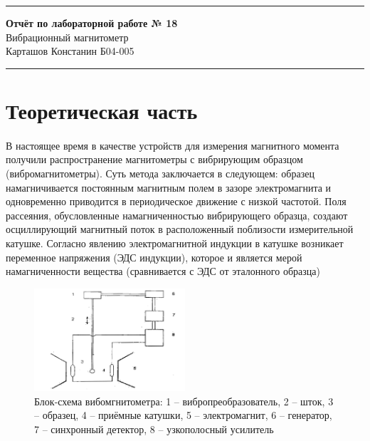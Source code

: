 \documentclass[a4paper,12pt]{article} %
\begin{document}


\hrule 	
\medskip
\begin{raggedright}
{\large \textbf{Отчёт по лабораторной работе № 18}}
\\
\medskip
{\Large Вибрационный магнитометр} 
\\
\medskip
{\large Карташов Констанин Б04-005}
\medskip
\hrule
\medskip
\end{raggedright}


\section{Теоретическая часть}

\paragraph{}
	В настоящее время в качестве устройств для измерения магнитного момента получили распространение магнитометры с вибрирующим образцом (вибромагнитометры). Суть метода заключается в следующем: образец намагничивается постоянным магнитным полем в зазоре электромагнита и одновременно приводится в периодическое движение с низкой частотой. Поля рассеяния, обусловленные намагниченностью вибрирующего образца, создают осциллирующий магнитный поток в расположенный поблизости измерительной катушке. Согласно явлению электромагнитной индукции в катушке возникает переменное напряжения (ЭДС индукции), которое и является мерой намагниченности вещества (сравнивается с ЭДС от эталонного образца)

\begin{figure}[h]
\centering
\includegraphics[width=0.5\textwidth]{setup.png}
\caption{Блок-схема вибомгнитометра: 1 -- вибропреобразователь, 2 -- шток, 3 -- образец, 4 -- приёмные катушки, 5 -- электромагнит, 6 -- генератор, 7 -- синхронный детектор, 8 -- узкополосный усилитель}
\label{fig:setup}
\end{figure}
\end{document}
